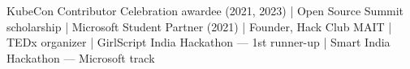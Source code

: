 

\begin{cvparagraph}
KubeCon Contributor Celebration awardee (2021, 2023) \quad|\quad
Open Source Summit scholarship \quad|\quad
Microsoft Student Partner (2021) \quad|\quad
Founder, Hack Club MAIT \quad|\quad
TEDx organizer \quad|\quad
GirlScript India Hackathon — 1st runner-up \quad|\quad
Smart India Hackathon — Microsoft track
\end{cvparagraph}
